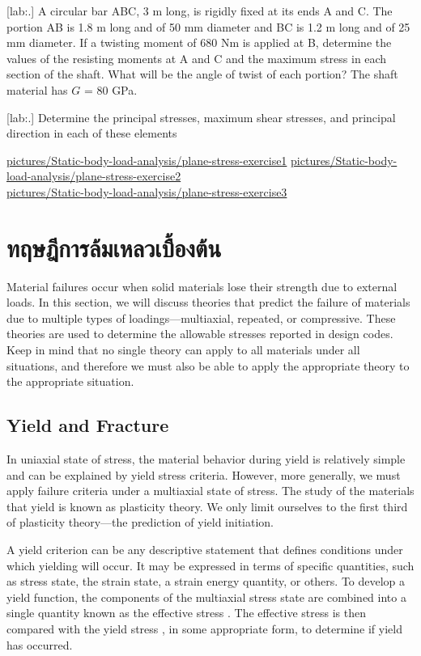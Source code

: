 \documentclass[a4paper,openany,12pt]{book}
\begin{document}
[lab:.] A circular bar ABC, 3 m long,
is rigidly fixed at its ends A and C. The portion AB is 1.8 m long and
of 50 mm diameter and BC is 1.2 m long and of 25 mm diameter. If a
twisting moment of 680 Nm is applied at B, determine the values of the
resisting moments at A and C and the maximum stress in each section of
the shaft. What will be the angle of twist of each portion? The shaft
material has \(G\) = 80 GPa.

[lab:.] Determine the principal
stresses, maximum shear stresses, and principal direction in each of
these elements

\url{pictures/Static-body-load-analysis/plane-stress-exercise1}
\url{pictures/Static-body-load-analysis/plane-stress-exercise2}\\
\url{pictures/Static-body-load-analysis/plane-stress-exercise3}

\chapter{ทฤษฎีการล้มเหลวเบื้องต้น}
\label{introduction-to-theories-of-failure}
Material failures occur when solid materials lose their strength due to
external loads. In this section, we will discuss theories that predict
the failure of materials due to multiple types of loadings---multiaxial,
repeated, or compressive. These theories are used to determine the
allowable stresses reported in design codes. Keep in mind that no single
theory can apply to all materials under all situations, and therefore we
must also be able to apply the appropriate theory to the appropriate
situation.

\section{Yield and Fracture}
\label{yield-and-fracture}
In uniaxial state of stress, the material behavior during yield is
relatively simple and can be explained by yield stress criteria.
However, more generally, we must apply failure criteria under a
multiaxial state of stress. The study of the materials that yield is
known as plasticity theory. We only limit ourselves to the first third
of plasticity theory---the prediction of yield initiation.

A yield criterion can be any descriptive statement that defines
conditions under which yielding will occur. It may be expressed in terms
of specific quantities, such as stress state, the strain state, a strain
energy quantity, or others. To develop a yield function, the components
of the multiaxial stress state are combined into a single quantity known
as the effective stress . The effective stress is then compared with the
yield stress , in some appropriate form, to determine if yield has
occurred.
\end{document}
